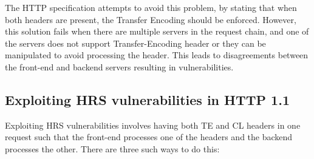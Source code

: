\documentclass[conference]{IEEEtran}
\begin{document}
The HTTP specification attempts to avoid this problem, by stating that when both headers are present, the Transfer Encoding should be enforced. However, this solution fails when there are multiple servers in the request chain, and one of the servers does not support Transfer-Encoding header or they can be manipulated to avoid processing the header. This leads to disagreements between the front-end and backend servers resulting in vulnerabilities. 

\subsection*{Exploiting HRS vulnerabilities in HTTP 1.1}
Exploiting HRS vulnerabilities involves having both TE and CL headers in one request such that the front-end processes one of the headers and the backend processes the other. There are three such ways to do this:
\end{document}
